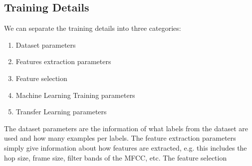 
\subsection{Training Details}
We can separate the training details into three categories:
\begin{enumerate}
  \item Dataset parameters
  \item Features extraction parameters
  \item Feature selection
  \item Machine Learning Training parameters
  \item Transfer Learning parameters
\end{enumerate}
The dataset parameters are the information of what labels from the dataset are used and how many examples per labels.
The feature extraction parameters simply give information about how features are extracted, e.g. this includes the hop size, frame size, filter bands of the MFCC, etc.
The feature selection

